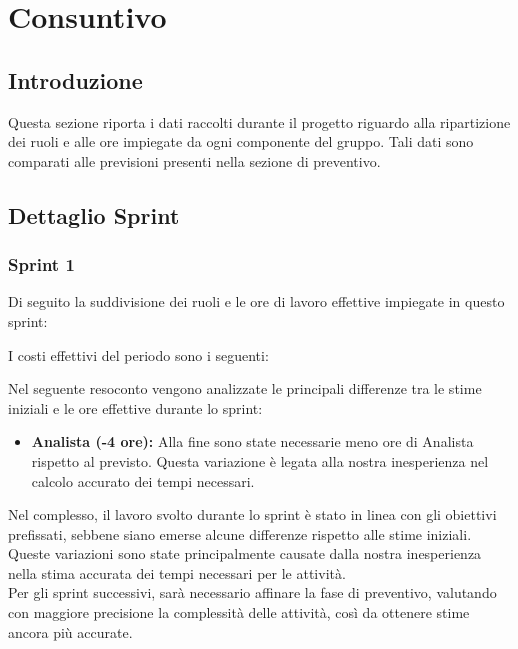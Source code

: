 \section{Consuntivo}
\subsection{Introduzione}
Questa sezione riporta i dati raccolti durante il progetto riguardo alla ripartizione dei ruoli e alle ore impiegate da ogni componente del gruppo. Tali dati sono comparati alle previsioni presenti nella sezione di preventivo.

\subsection{Dettaglio Sprint}

\subsubsection{Sprint 1}
Di seguito la suddivisione dei ruoli e le ore di lavoro effettive impiegate in questo sprint:




I costi effettivi del periodo sono i seguenti:




Nel seguente resoconto vengono analizzate le principali differenze tra le stime iniziali e le ore effettive durante lo sprint:
\begin{itemize}
    \item \textbf{Analista (-4 ore):} Alla fine sono state necessarie meno ore di Analista rispetto al previsto. Questa variazione è legata alla nostra inesperienza nel calcolo accurato dei tempi necessari.

\end{itemize}
Nel complesso, il lavoro svolto durante lo sprint è stato in linea con gli obiettivi prefissati, sebbene siano emerse alcune differenze rispetto alle stime iniziali. Queste variazioni sono state principalmente causate dalla nostra inesperienza nella stima accurata dei tempi necessari per le attività.
\\
Per gli sprint successivi, sarà necessario affinare la fase di preventivo, valutando con maggiore precisione la complessità delle attività, così da ottenere stime ancora più accurate.